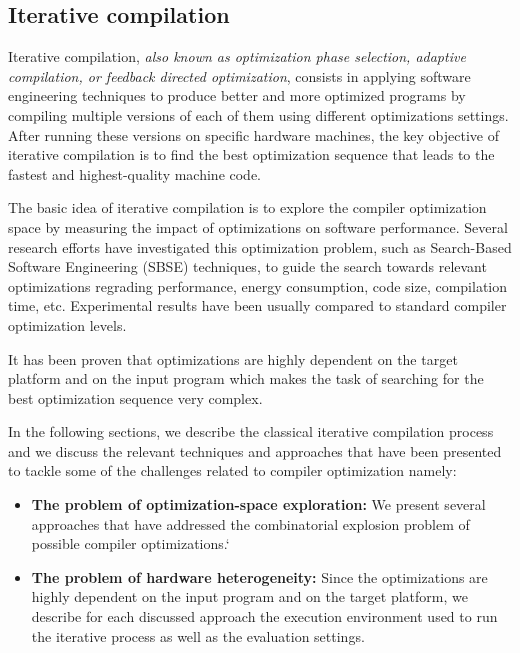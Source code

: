\subsection{Iterative compilation}
Iterative compilation, \textit{also known as optimization phase selection, adaptive compilation, or feedback directed optimization}\cite{triantafyllis2003compiler}, consists in applying software engineering techniques to produce better and more optimized programs by compiling multiple versions of each of them using different optimizations settings. After running these versions on specific hardware machines, the key objective of iterative compilation is to find the best optimization sequence that leads to the fastest and highest-quality machine code. 

The basic idea of iterative compilation is to explore the compiler optimization space by measuring the impact of optimizations on software performance.
Several research efforts have investigated this optimization problem, such as Search-Based Software Engineering (SBSE) techniques, to guide the search towards relevant optimizations regrading performance, energy consumption, code size, compilation time, etc. Experimental results have been usually compared to standard compiler optimization levels.  

It has been proven that optimizations are highly dependent on the target platform and on the input program which makes the task of searching for the best optimization sequence very complex\cite{triantafyllis2003compiler}.

In the following sections, we describe the classical iterative compilation process and we discuss the relevant techniques and approaches that have been presented to tackle some of the challenges related to compiler optimization namely:
\begin{itemize}
	\item \textbf{The problem of optimization-space exploration:} We present several approaches that have addressed the combinatorial explosion problem of possible compiler optimizations.`
	
	\item \textbf{The problem of hardware heterogeneity:} Since the optimizations are highly dependent on the input program and on the target platform, we describe for each discussed approach the execution environment used to run the iterative process as well as the evaluation settings.  
\end{itemize}

